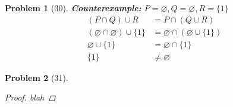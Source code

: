 \documentclass{article}
\let\emptyset\varnothing
\theoremstyle{example}
\newtheorem{prob}{Problem}
\begin{document}
\begin{prob}[30]
\textbf{Counterexample:} $P = \emptyset, Q = \emptyset, R = \{1\}$
\begin{align*}
  (P \cap Q) \cup R                     &= P \cap (Q \cup R)\\
  (\emptyset \cap \emptyset) \cup \{1\} &= \emptyset \cap (\emptyset \cup \{1\})\\
  \emptyset \cup \{1\}                  &= \emptyset \cap \{1\}\\
  \{1\}                                 &\not = \emptyset
\end{align*}
\end{prob}

\begin{prob}[31]
\begin{proof}
blah
\end{proof}
\end{prob}
\end{document}
